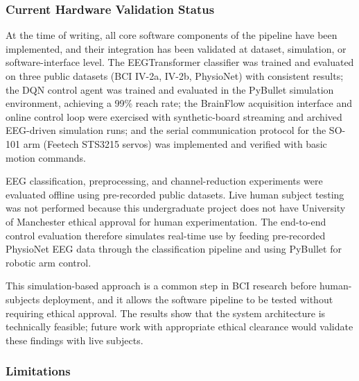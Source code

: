\documentclass[12pt, a4paper]{article}
\begin{document}
\subsubsection{Current Hardware Validation Status}

At the time of writing, all core software components of the pipeline have been implemented, and their integration has been validated at dataset, simulation, or software-interface level. The EEGTransformer classifier was trained and evaluated on three public datasets (BCI IV-2a, IV-2b, PhysioNet) with consistent results; the DQN control agent was trained and evaluated in the PyBullet simulation environment, achieving a 99\% reach rate; the BrainFlow acquisition interface and online control loop were exercised with synthetic-board streaming and archived EEG-driven simulation runs; and the serial communication protocol for the SO-101 arm (Feetech STS3215 servos) was implemented and verified with basic motion commands.

EEG classification, preprocessing, and channel-reduction experiments were evaluated offline using pre-recorded public datasets. Live human subject testing was not performed because this undergraduate project does not have University of Manchester ethical approval for human experimentation. The end-to-end control evaluation therefore simulates real-time use by feeding pre-recorded PhysioNet EEG data through the classification pipeline and using PyBullet for robotic arm control.

This simulation-based approach is a common step in BCI research before human-subjects deployment, and it allows the software pipeline to be tested without requiring ethical approval. The results show that the system architecture is technically feasible; future work with appropriate ethical clearance would validate these findings with live subjects.

\subsubsection{Limitations}
\label{sec:disc_limitations}
\end{document}
